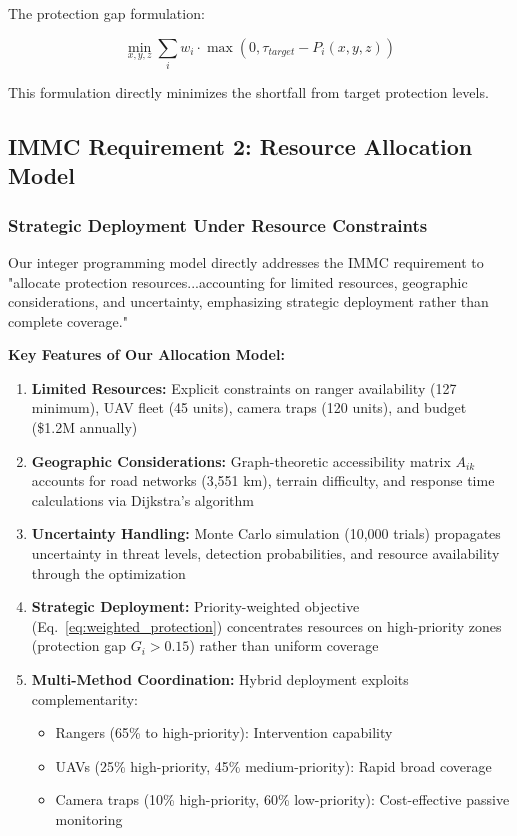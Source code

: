 The protection gap formulation:

\begin{equation}
\min_{x, y, z} \sum_{i} w_i \cdot \max(0, \tau_{target} - P_i(x, y, z))
\label{eq:gap_minimization}
\end{equation}

This formulation directly minimizes the shortfall from target protection levels.

\subsection*{IMMC Requirement 2: Resource Allocation Model}

\subsubsection{Strategic Deployment Under Resource Constraints}

Our integer programming model directly addresses the IMMC requirement to "allocate protection resources...accounting for limited resources, geographic considerations, and uncertainty, emphasizing strategic deployment rather than complete coverage."

\textbf{Key Features of Our Allocation Model:}

\begin{enumerate}
    \item \textbf{Limited Resources:} Explicit constraints on ranger availability (127 minimum), UAV fleet (45 units), camera traps (120 units), and budget (\$1.2M annually)

    \item \textbf{Geographic Considerations:} Graph-theoretic accessibility matrix $A_{ik}$ accounts for road networks (3,551 km), terrain difficulty, and response time calculations via Dijkstra's algorithm

    \item \textbf{Uncertainty Handling:} Monte Carlo simulation (10,000 trials) propagates uncertainty in threat levels, detection probabilities, and resource availability through the optimization

    \item \textbf{Strategic Deployment:} Priority-weighted objective (Eq.~\ref{eq:weighted_protection}) concentrates resources on high-priority zones (protection gap $G_i > 0.15$) rather than uniform coverage

    \item \textbf{Multi-Method Coordination:} Hybrid deployment exploits complementarity:
    \begin{itemize}
        \item Rangers (65\% to high-priority): Intervention capability
        \item UAVs (25\% high-priority, 45\% medium-priority): Rapid broad coverage
        \item Camera traps (10\% high-priority, 60\% low-priority): Cost-effective passive monitoring
    \end{itemize}
\end{enumerate}


